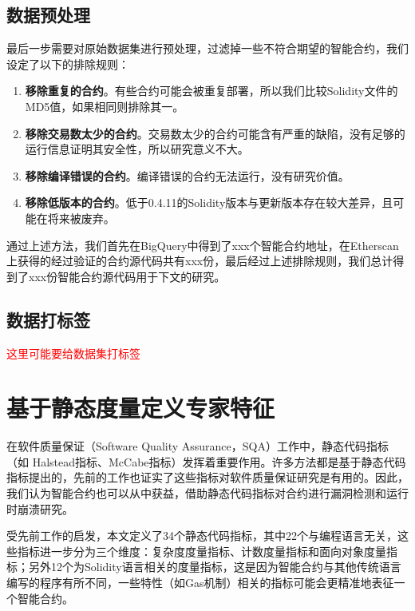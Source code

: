 \subsection{数据预处理}

最后一步需要对原始数据集进行预处理，过滤掉一些不符合期望的智能合约，我们设定了以下的排除规则：
\begin{enumerate}
    \item \textbf{移除重复的合约}。有些合约可能会被重复部署，所以我们比较Solidity文件的MD5值，如果相同则排除其一。
    \item \textbf{移除交易数太少的合约}。交易数太少的合约可能含有严重的缺陷，没有足够的运行信息证明其安全性，所以研究意义不大。
    \item \textbf{移除编译错误的合约}。编译错误的合约无法运行，没有研究价值。
    \item \textbf{移除低版本的合约}。低于0.4.11的Solidity版本与更新版本存在较大差异，且可能在将来被废弃。
\end{enumerate}

通过上述方法，我们首先在BigQuery中得到了xxx个智能合约地址，在Etherscan上获得的经过验证的合约源代码共有xxx份，最后经过上述排除规则，我们总计得到了xxx份智能合约源代码用于下文的研究。
\subsection{数据打标签}
\textcolor{red}{这里可能要给数据集打标签}
\section{基于静态度量定义专家特征}
在软件质量保证（Software Quality Assurance，SQA）工作中，静态代码指标（如 Halstead\cite{halstead}指标、McCabe\cite{mccabe}指标）发挥着重要作用。许多方法都是基于静态代码指标提出的，先前的工作\cite{menzies2007data,meyers2007empirical,zimmermann2007predicting}也证实了这些指标对软件质量保证研究是有用的。因此，我们认为智能合约也可以从中获益，借助静态代码指标对合约进行漏洞检测和运行时崩溃研究。

受先前工作\cite{halstead,mccabe,menzies2007data}的启发，本文定义了34个静态代码指标，其中22个与编程语言无关，这些指标进一步分为三个维度：复杂度度量指标、计数度量指标和面向对象度量指标；另外12个为Solidity语言相关的度量指标，这是因为智能合约与其他传统语言编写的程序有所不同，一些特性（如Gas机制）相关的指标可能会更精准地表征一个智能合约。

